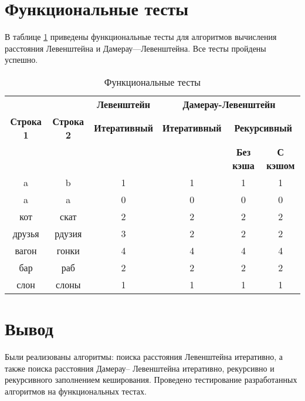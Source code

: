 \clearpage

\section{Функциональные тесты}

В таблице \ref{tbl:func_tests} приведены функциональные тесты для алгоритмов вычисления расстояния Левенштейна и Дамерау—Левенштейна. Все тесты пройдены успешно.

\begin{table}[ht]
	\small
	\begin{center}
		\caption{Функциональные тесты}
		\label{tbl:func_tests}
		\begin{tabular}{|c|c|c|c|c|c|}
			\hline
			&
			& \multicolumn{1}{c|}{\bfseries Левенштейн}
			& \multicolumn{3}{c|}{\bfseries Дамерау-Левенштейн} \\ \cline{3-6}
			
			\bfseries Строка 1 & \bfseries Строка 2 & \bfseries Итеративный & \bfseries Итеративный
			
			& \multicolumn{2}{c|}{\bfseries Рекурсивный} \\ \cline{5-6}
			& & & & \bfseries Без кэша & \bfseries С кэшом \\
			\hline
			a & b & 1 & 1 & 1 & 1 \\
			\hline
			a & a & 0 & 0 & 0 & 0 \\
			\hline
			кот & скат & 2 & 2 & 2 & 2 \\
			\hline
			друзья & рдузия & 3 & 2 & 2 & 2 \\
			\hline
			вагон & гонки & 4 & 4 & 4 & 4 \\
			\hline
			бар & раб & 2 & 2 & 2 & 2 \\
			\hline
			слон & слоны & 1 & 1 & 1 & 1 \\
			\hline
		\end{tabular}
	\end{center}
\end{table}

\section{Вывод}

Были реализованы алгоритмы: поиска расстояния Левенштейна
итеративно, а также поиска расстояния Дамерау–
Левенштейна итеративно, рекурсивно и рекурсивного заполнением кеширования. Проведено тестирование разработанных алгоритмов на функциональных тестах.
